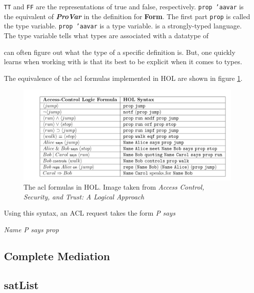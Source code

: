 \documentclass[../../main/main.tex]{subfiles}
\begin{document}
\texttt{TT}  and \texttt{FF} are the  representations of true and false, respectively.  \texttt{prop 'aavar} is the equivalent of \textit{\textbf{ProVar}} in the definition for \textbf{Form}.  The first part \texttt{prop} is called the type variable.  \texttt{prop 'aavar} is a type variable.   is a strongly-typed language.  The type variable tells  what types are associated with a datatype of


 can often figure out what the type of a specific definition is.  But, one quickly learns when working with  is that its best to be explicit when it comes to types.  

The equivalence of the \gls{acl} formulas implemented in HOL are shown in figure \ref{aclformulasHOL}.

\begin{figure}[h]
\centering
\includegraphics[width=\textwidth]{../figures/aclformulasHOL}
\caption{\label{aclformulasHOL}The \gls{acl} formulas in HOL.  Image taken from \textit{Access Control, Security, and Trust: A Logical Approach}\cite{ChinOlder}}
\end{figure}

Using this syntax, an ACL request takes the form \textit{P says \textphi} \centerline{ \textit{Name P says prop \textphi}}


\subsection{Complete Mediation}
\subsection{satList}
\end{document}
